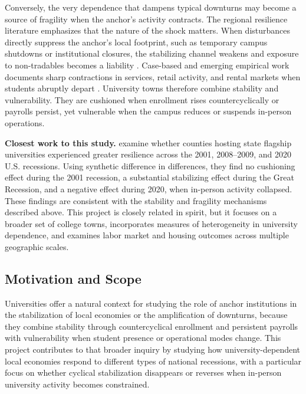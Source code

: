 Conversely, the very dependence that dampens typical downturns may become a source of fragility when the anchor’s activity contracts. The regional resilience literature emphasizes that the nature of the shock matters. When disturbances directly suppress the anchor’s local footprint, such as temporary campus shutdowns or institutional closures, the stabilizing channel weakens and exposure to non-tradables becomes a liability \citep{martinNotionRegionalEconomic2015}. Case-based and emerging empirical work documents sharp contractions in services, retail activity, and rental markets when students abruptly depart \citep{howardUniversitiesImproveLocal2024,Harker2024AnchorReliance}. University towns therefore combine stability and vulnerability. They are cushioned when enrollment rises countercyclically or payrolls persist, yet vulnerable when the campus reduces or suspends in-person operations.

\noindent \textbf{Closest work to this study.} \citet{jumpResearchUniversitiesRecession} examine whether counties hosting state flagship universities experienced greater resilience across the 2001, 2008--2009, and 2020 U.S. recessions. Using synthetic difference in differences, they find no cushioning effect during the 2001 recession, a substantial stabilizing effect during the Great Recession, and a negative effect during 2020, when in-person activity collapsed. These findings are consistent with the stability and fragility mechanisms described above. This project is closely related in spirit, but it focuses on a broader set of college towns, incorporates measures of heterogeneity in university dependence, and examines labor market and housing outcomes across multiple geographic scales.

\subsection{ Motivation and Scope}

\noindent Universities offer a natural context for studying the role of anchor institutions in the stabilization of local economies or the amplification of downturns, because they combine stability through countercyclical enrollment and persistent payrolls with vulnerability when student presence or operational modes change. This project contributes to that broader inquiry by studying how university-dependent local economies respond to different types of national recessions, with a particular focus on whether cyclical stabilization disappears or reverses when in-person university activity becomes constrained.

